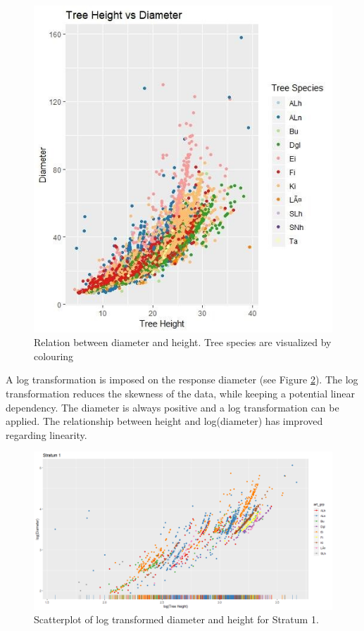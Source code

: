 \begin{figure}[H]
\centering
  \includegraphics[scale = 0.75]{diam_vs_height.jpg}
  \caption{Relation between diameter and height. Tree species are visualized by colouring}
  \label{fig:diameter vs height}
\end{figure}

A log transformation is imposed on the response diameter (see Figure \ref{fig:log transformation diam vs height}). The log
transformation reduces the skewness of the data, while keeping a potential linear dependency. The diameter is
always positive and a log transformation can be applied. The relationship between height and log(diameter) has
improved regarding linearity.

\begin{figure}[H]
\centering
  \includegraphics[scale = 0.45]{log_diam_vs_height.png}
  \caption{Scatterplot of log transformed diameter and height for Stratum 1.}
  \label{fig:log transformation diam vs height}
\end{figure}


